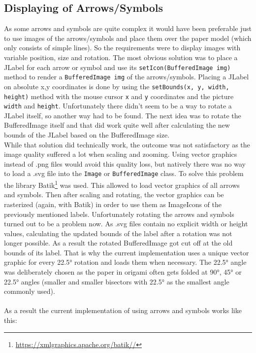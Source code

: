 \subsection{Displaying of Arrows/Symbols}
\label{sec:displaySymbols}
As some arrows and symbols are quite complex it would have been preferable just to use images of the arrows/symbols and place them over the  paper model (which only consists of simple lines). So the requirements were to display images with variable position, size and rotation. The most obvious solution was to place a JLabel for each arrow or symbol and use its \texttt{setIcon(BufferedImage img)} method to render a \texttt{BufferedImage img} of the arrows/symbols. Placing a JLabel on absolute x,y coordinates is done by using the \texttt{setBounds(x, y, width, height)} method with the mouse cursor \texttt{x} and \texttt{y} coordinates and the picture \texttt{width} and \texttt{height}. Unfortunately there didn't seem to be a way to rotate a JLabel itself, so another way had to be found. The next idea was to rotate the BufferedImage itself and that did work quite well after calculating the new bounds of the JLabel based on the BufferedImage size.\\
While that solution did technically work, the outcome was not satisfactory as the image quality suffered a lot when scaling and zooming. Using vector graphics instead of .png files would avoid this quality loss, but natively there was no way to load a .svg file into the \texttt{Image} or \texttt{BufferedImage} class. To solve this problem the library Batik\footnote{\url{https://xmlgraphics.apache.org/batik//}} was used. This allowed to load vector graphics of all arrows and symbols. Then after scaling and rotating, the vector graphics can be rasterized (again, with Batik) in order to use them as ImageIcons of the previously mentioned labels. Unfortunately rotating the arrows and symbols turned out to be a problem now. As .svg files contain no explicit width or height values, calculating the updated bounds of the label after a rotation was not longer possible. As a result the rotated BufferedImage got cut off at the old bounds of its label. That is why the current implementation uses a unique vector graphic for every 22.5° rotation and loads them when necessary. The 22.5° angle was deliberately chosen as the paper in origami often gets folded at 90°, 45° or 22.5° angles (smaller and smaller bisectors with 22.5° as the smallest angle commonly used).\\%
\\
As a result the current implementation of using arrows and symbols works like this:

